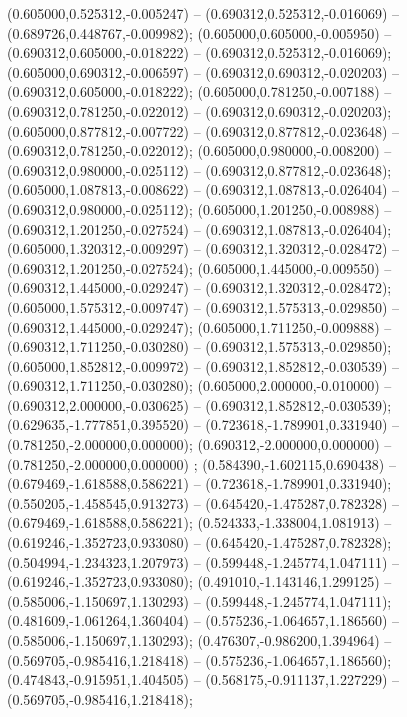  (0.605000,0.525312,-0.005247) -- (0.690312,0.525312,-0.016069) -- (0.689726,0.448767,-0.009982);
 (0.605000,0.605000,-0.005950) -- (0.690312,0.605000,-0.018222) -- (0.690312,0.525312,-0.016069);
 (0.605000,0.690312,-0.006597) -- (0.690312,0.690312,-0.020203) -- (0.690312,0.605000,-0.018222);
 (0.605000,0.781250,-0.007188) -- (0.690312,0.781250,-0.022012) -- (0.690312,0.690312,-0.020203);
 (0.605000,0.877812,-0.007722) -- (0.690312,0.877812,-0.023648) -- (0.690312,0.781250,-0.022012);
 (0.605000,0.980000,-0.008200) -- (0.690312,0.980000,-0.025112) -- (0.690312,0.877812,-0.023648);
 (0.605000,1.087813,-0.008622) -- (0.690312,1.087813,-0.026404) -- (0.690312,0.980000,-0.025112);
 (0.605000,1.201250,-0.008988) -- (0.690312,1.201250,-0.027524) -- (0.690312,1.087813,-0.026404);
 (0.605000,1.320312,-0.009297) -- (0.690312,1.320312,-0.028472) -- (0.690312,1.201250,-0.027524);
 (0.605000,1.445000,-0.009550) -- (0.690312,1.445000,-0.029247) -- (0.690312,1.320312,-0.028472);
 (0.605000,1.575312,-0.009747) -- (0.690312,1.575313,-0.029850) -- (0.690312,1.445000,-0.029247);
 (0.605000,1.711250,-0.009888) -- (0.690312,1.711250,-0.030280) -- (0.690312,1.575313,-0.029850);
 (0.605000,1.852812,-0.009972) -- (0.690312,1.852812,-0.030539) -- (0.690312,1.711250,-0.030280);
 (0.605000,2.000000,-0.010000) -- (0.690312,2.000000,-0.030625) -- (0.690312,1.852812,-0.030539);
 (0.629635,-1.777851,0.395520) -- (0.723618,-1.789901,0.331940) -- (0.781250,-2.000000,0.000000);
 (0.690312,-2.000000,0.000000) -- (0.781250,-2.000000,0.000000) ;
 (0.584390,-1.602115,0.690438) -- (0.679469,-1.618588,0.586221) -- (0.723618,-1.789901,0.331940);
 (0.550205,-1.458545,0.913273) -- (0.645420,-1.475287,0.782328) -- (0.679469,-1.618588,0.586221);
 (0.524333,-1.338004,1.081913) -- (0.619246,-1.352723,0.933080) -- (0.645420,-1.475287,0.782328);
 (0.504994,-1.234323,1.207973) -- (0.599448,-1.245774,1.047111) -- (0.619246,-1.352723,0.933080);
 (0.491010,-1.143146,1.299125) -- (0.585006,-1.150697,1.130293) -- (0.599448,-1.245774,1.047111);
 (0.481609,-1.061264,1.360404) -- (0.575236,-1.064657,1.186560) -- (0.585006,-1.150697,1.130293);
 (0.476307,-0.986200,1.394964) -- (0.569705,-0.985416,1.218418) -- (0.575236,-1.064657,1.186560);
 (0.474843,-0.915951,1.404505) -- (0.568175,-0.911137,1.227229) -- (0.569705,-0.985416,1.218418);
